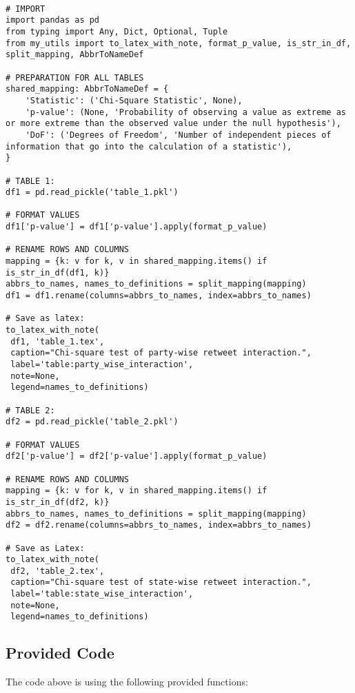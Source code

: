 \documentclass[11pt]{article}
\begin{document}
\begin{verbatim}

# IMPORT
import pandas as pd
from typing import Any, Dict, Optional, Tuple
from my_utils import to_latex_with_note, format_p_value, is_str_in_df, split_mapping, AbbrToNameDef

# PREPARATION FOR ALL TABLES
shared_mapping: AbbrToNameDef = {
    'Statistic': ('Chi-Square Statistic', None),
    'p-value': (None, 'Probability of observing a value as extreme as or more extreme than the observed value under the null hypothesis'),
    'DoF': ('Degrees of Freedom', 'Number of independent pieces of information that go into the calculation of a statistic'),
}

# TABLE 1:
df1 = pd.read_pickle('table_1.pkl')

# FORMAT VALUES
df1['p-value'] = df1['p-value'].apply(format_p_value)

# RENAME ROWS AND COLUMNS
mapping = {k: v for k, v in shared_mapping.items() if is_str_in_df(df1, k)}
abbrs_to_names, names_to_definitions = split_mapping(mapping)
df1 = df1.rename(columns=abbrs_to_names, index=abbrs_to_names)

# Save as latex:
to_latex_with_note(
 df1, 'table_1.tex',
 caption="Chi-square test of party-wise retweet interaction.", 
 label='table:party_wise_interaction',
 note=None,
 legend=names_to_definitions)

# TABLE 2:
df2 = pd.read_pickle('table_2.pkl')

# FORMAT VALUES
df2['p-value'] = df2['p-value'].apply(format_p_value)

# RENAME ROWS AND COLUMNS
mapping = {k: v for k, v in shared_mapping.items() if is_str_in_df(df2, k)} 
abbrs_to_names, names_to_definitions = split_mapping(mapping)
df2 = df2.rename(columns=abbrs_to_names, index=abbrs_to_names)

# Save as Latex:
to_latex_with_note(
 df2, 'table_2.tex',
 caption="Chi-square test of state-wise retweet interaction.", 
 label='table:state_wise_interaction',
 note=None,
 legend=names_to_definitions)

\end{verbatim}

\subsection{Provided Code}
The code above is using the following provided functions:
\end{document}
